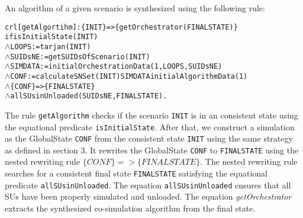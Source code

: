 An algorithm of a given scenario is synthesized using the following rule:
\small
\begin{alltt}
crl [getAlgortihm]: \{ INIT \} => \{ getOrchestrator(FINALSTATE) \}
if isInitialState(INIT)
  \(\land\) LOOPS := tarjan(INIT)
  \(\land\) SUIDsNE := getSUIDsOfScenario(INIT)
  \(\land\) SIMDATA := initialOrchestrationData(1,LOOPS,SUIDsNE)
  \(\land\) CONF := calculateSNSet(INIT) SIMDATA initialAlgorithmData(1)
  \(\land\) \{CONF\} => \{ FINALSTATE\} 
  \(\land\) allSUsinUnloaded(SUIDsNE, FINALSTATE) .
\end{alltt}
\normalfont
The rule \texttt{getAlgorithm} checks if the scenario \texttt{INIT} is in an consistent state using the equational predicate \texttt{isInitialState}.
After that, we construct a simulation as the GlobalState \texttt{CONF} from the consistent state \texttt{INIT} using the same strategy as defined in section 3.
It rewrites the GlobalState \texttt{CONF} to \texttt{FINALSTATE} using the nested rewriting rule $\{CONF\} => \{ FINALSTATE\}$.
The nested rewriting rule searches for a consistent final state \texttt{FINALSTATE} satisfying the equational predicate \texttt{allSUsinUnloaded}.
The equation \texttt{allSUsinUnloaded} ensures that all SUs have been properly simulated and unloaded.
The equation \emph{getOrchestrator} extracts the synthesized co-simulation algorithm from the final state.

